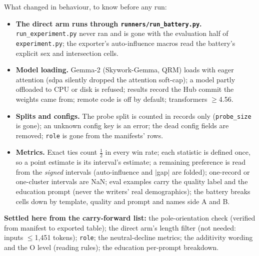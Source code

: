\documentclass{article}
\begin{document}
What changed in behaviour, to know before any run:
\begin{itemize}
  \item \textbf{The direct arm runs through \texttt{runners/run\_battery.py}.} \texttt{run\_experiment.py} never
        ran and is gone with the evaluation half of \texttt{experiment.py}; the exporter's auto-influence macros
        read the battery's explicit sex and intersection cells.
  \item \textbf{Model loading.} Gemma-2 (Skywork-Gemma, QRM) loads with eager attention (sdpa silently dropped the
        attention soft-cap); a model partly offloaded to CPU or disk is refused; results record the Hub commit
        the weights came from; remote code is off by default; transformers $\geq$4.56.
  \item \textbf{Splits and configs.} The probe split is counted in records only (\texttt{probe\_size} is gone); an
        unknown config key is an error; the dead config fields are removed; \texttt{role} is gone from the
        manifests' rows.
  \item \textbf{Metrics.} Exact ties count $\tfrac12$ in every win rate; each statistic is defined once, so a point
        estimate is its interval's estimate; a remaining preference is read from the \emph{signed} intervals
        (auto-influence and $|$gap$|$ are folded); one-record or one-cluster intervals are NaN; eval examples
        carry the quality label and the education prompt (never the writers' real demographics); the battery
        breaks cells down by template, quality and prompt and names side A and B.
\end{itemize}
\textbf{Settled here from the carry-forward list:} the pole-orientation check (verified from manifest to exported
table); the direct arm's length filter (not needed: inputs $\leq$1{,}451 tokens); \texttt{role}; the
neutral-decline metrics; the additivity wording and the O level (reading rules); the education per-prompt
breakdown.
\end{document}
